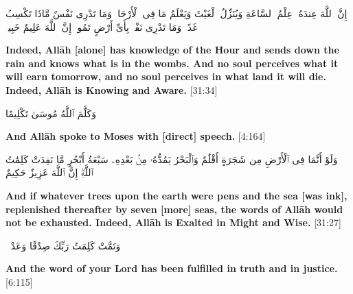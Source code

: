 \begin{center}
    \begin{RLtext}
        إِنَّ ٱللَّهَ عِندَهُۥ عِلْمُ ٱلسَّاعَةِ وَيُنَزِّلُ ٱلْغَيْثَ وَيَعْلَمُ مَا فِى ٱلْأَرْحَامِۖ وَمَا تَدْرِى نَفْسٌ مَّاذَا تَكْسِبُ غَدًاۖ وَمَا تَدْرِى نَفْسٌۢ بِأَىِّ أَرْضٍ تَمُوتُۚ إِنَّ ٱللَّهَ عَلِيمٌ خَبِيرٌۢ 
    \end{RLtext}
\end{center}
\textbf{Indeed, Allāh [alone] has knowledge of the Hour and sends down the rain and knows what is in the wombs. And no soul perceives what it will earn tomorrow, and no soul perceives in what land it will die. Indeed, Allāh is Knowing and Aware.} [31:34]

\begin{center}
    \begin{RLtext}
        وَكَلَّمَ ٱللَّهُ مُوسَىٰ تَكْلِيمًا 
    \end{RLtext}
    \textbf{And Allāh spoke to Moses with [direct] speech.} [4:164]
    \vspace{10px}
    \begin{RLtext}
        وَلَوْ أَنَّمَا فِى ٱلْأَرْضِ مِن شَجَرَةٍ أَقْلَٰمٌ وَٱلْبَحْرُ يَمُدُّهُۥ مِنۢ بَعْدِهِۦ سَبْعَةُ أَبْحُرٍ مَّا نَفِدَتْ كَلِمَٰتُ ٱللَّهِۗ إِنَّ ٱللَّهَ عَزِيزٌ حَكِيمٌ 
    \end{RLtext}
\end{center}
\textbf{And if whatever trees upon the earth were pens and the sea [was ink], replenished thereafter by seven [more] seas, the words of Allāh would not be exhausted. Indeed, Allāh is Exalted in Might and Wise.} [31:27]

\begin{center}
    \begin{RLtext}
        وَتَمَّتْ كَلِمَتُ رَبِّكَ صِدْقًا وَعَدْلًاۚ 
    \end{RLtext}
    \textbf{And the word of your Lord has been fulfilled in truth and in justice.} [6:115]
\end{center}

